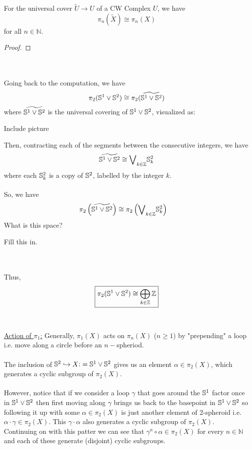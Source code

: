 \documentclass[11pt]{article}
\begin{document}
\begin{redbox}
  \begin{lemma}
    For the universal cover $\widetilde{U} \rightarrow U$ of a CW Complex $U$, we have $$ \pi_n(\widetilde{X}) \cong \pi_n(X) $$ for all $n \in \mathbb{N}$.
  \end{lemma}
\end{redbox}
\vskip 0.25cm
\begin{proof}
  
\end{proof} \\
\\
Going back to the computation, we have $$ \pi_2(\mathbb{S}^1 \vee \mathbb{S}^2) \cong \pi_2(\widetilde{ \mathbb{S}^1 \vee \mathbb{S}^2 }) $$ where $\widetilde{\mathbb{S}^1 \vee \mathbb{S}^2}$ is the universal covering of $\mathbb{S}^1 \vee \mathbb{S}^2$, visualized as:
\begin{center}
  Include picture
\end{center} Then, contracting each of the segments between the consecutive integers, we have $$ \widetilde{\mathbb{S}^1 \vee \mathbb{S}^2} \cong {\bigvee}_{k \in \mathbb{Z}} \mathbb{S}^2_{k} $$ where each $\mathbb{S}^2_k$ is a copy of $\mathbb{S}^2$, labelled by the integer $k$. 
\\
\\
So, we have 
\begin{align*}
  \pi_2\left(\widetilde{\mathbb{S}^1 \vee \mathbb{S}^2}\right) &\cong \pi_2 \left( {\bigvee}_{k \in \mathbb{Z}} \mathbb{S}^2_{k} \right) 
\end{align*} What is this space? \begin{note}
  {Fill this in.}
\end{note}
\\
\\
Thus,
\[ \boxed{ \pi_2(\mathbb{S}^1 \vee \mathbb{S}^2) \cong \bigoplus_{k \in \mathbb{Z}} \mathbb{Z} } \] \\
\\
\underline{Action of $\pi_1$:} Generally, $\pi_1(X)$ acts on $\pi_n(X)$ ($n \geq 1$) by "prepending" a loop i.e. move along a circle before an $n-$spheriod.
\\
\\
The inclusion of $\mathbb{S}^2 \hookrightarrow X \text{:}= \mathbb{S}^1 \vee \mathbb{S}^2$ gives us an element $\alpha \in \pi_2(X)$, which generates a cyclic subgroup of $\pi_2(X)$. 
\\
\\
However, notice that if we consider a loop $\gamma$ that goes around the $\mathbb{S}^1$ factor once in $\mathbb{S}^1 \vee \mathbb{S}^2$ then first moving along $\gamma$ brings us back to the basepoint in $\mathbb{S}^1 \vee \mathbb{S}^2$ so following it up with some $\alpha \in \pi_2(X)$ is just another element of 2-spheroid i.e. $\alpha \cdot \gamma \in \pi_2(X)$. This $\gamma \cdot \alpha$ also generates a cyclic subgroup of $\pi_2(X)$. Continuing on with this patter we can see that $\gamma^n \circ \alpha \in \pi_2(X)$ for every $n \in \mathbb{N}$ and each of these generate (disjoint) cyclic subgroups.
\end{document}
